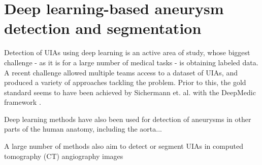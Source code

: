 
\section{Deep learning-based aneurysm detection and segmentation}
Detection of UIAs using deep learning is an active area of study, whose biggest challenge - as it is for a large number of medical tasks - is obtaining labeled data. A recent challenge  allowed multiple teams access to a dataset of UIAs, and produced a variety of approaches tackling the problem. Prior to this, the gold standard seems to have been achieved by Sichermann et. al. \cite{Sichermann2019} with the DeepMedic framework \cite{deepmedic}.

Deep learning methods have also been used for detection of aneurysms in other parts of the human anatomy, including the aorta... 

A large number of methods also aim to detect or segment UIAs in computed tomography (CT) angiography images 










